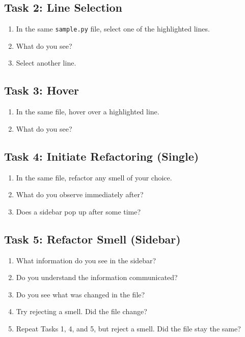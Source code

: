 \documentclass[12pt, titlepage]{article}
\begin{document}
\subsection*{Task 2: Line Selection}
\begin{enumerate}
    \item In the same \texttt{sample.py} file, select one of the highlighted lines.
    \item What do you see?
    \item Select another line.
\end{enumerate}

\subsection*{Task 3: Hover}
\begin{enumerate}
    \item In the same file, hover over a highlighted line.
    \item What do you see?
\end{enumerate}

\subsection*{Task 4: Initiate Refactoring (Single)}
\begin{enumerate}
    \item In the same file, refactor any smell of your choice.
    \item What do you observe immediately after?
    \item Does a sidebar pop up after some time?
\end{enumerate}

\subsection*{Task 5: Refactor Smell (Sidebar)}
\begin{enumerate}
    \item What information do you see in the sidebar?
    \item Do you understand the information communicated?
    \item Do you see what was changed in the file?
    \item Try rejecting a smell. Did the file change?
    \item Repeat Tasks 1, 4, and 5, but reject a smell. Did the file stay the same?
\end{enumerate}
\end{document}
